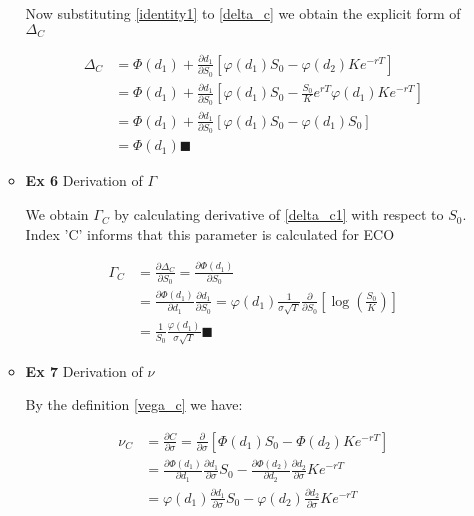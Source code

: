 \documentclass[12pt]{article}
\begin{document}
\begin{enumerate}[leftmargin=\labelsep]
\begin{itemize}
Now substituting \eqref{identity1} to \eqref{delta_c} we obtain the explicit form of $\Delta_C$

\begin{equation}
\begin{split}
 \label{delta_c1}
        \Delta_C &=  \Phi(d_1) + 
     \frac{\partial d_1}{\partial S_0} \left[ 
     \varphi(d_1)S_0
     -\varphi(d_2)Ke^{-rT}
     \right]\\   
     &=  \Phi(d_1) + 
     \frac{\partial d_1}{\partial S_0} \left[ 
     \varphi(d_1)S_0
     -\frac{S_0}{K} e^{rT} \varphi(d_1) Ke^{-rT}
     \right]\\  
     &=  \Phi(d_1) + 
     \frac{\partial d_1}{\partial S_0} \left[ 
     \varphi(d_1)S_0
     -\varphi(d_1) S_0
     \right]\\ 
     &=  \Phi(d_1) \blacksquare
\end{split}
\end{equation}

\item \textbf{Ex 6} Derivation of $\Gamma$

We obtain $\Gamma_C$ by calculating derivative of \eqref{delta_c1} with respect to $S_0$. Index 'C' informs that this parameter is calculated for ECO

\begin{equation}
\begin{split}\label{gamma}
        \Gamma_C &= \frac{\partial \Delta_C}{\partial S_0}
        = \frac{\partial \Phi(d_1)}{\partial S_0} \\
        &= \frac{\partial  \Phi(d_1)}{\partial d_1} 
        \frac{\partial  d_1}{\partial S_0} 
        = \varphi(d_1) \frac{1}{\sigma \sqrt{T}}\frac{\partial }{\partial S_0}  \left[ \log\left(\frac{S_0}{K}\right) \right] \\
        &= \frac{1}{S_0}\frac{\varphi(d_1)}{\sigma  \sqrt{T}} \blacksquare\end{split}
\end{equation}

\item \textbf{Ex 7} Derivation of $\nu$

By the definition \eqref{vega_c} we have:

\begin{equation}
\begin{split}\label{vega_c1}
        \nu_C &= \frac{\partial C}{\partial \sigma}
        = \frac{\partial }{\partial \sigma} 
        \left[ \Phi(d_1)S_0 - \Phi(d_2)Ke^{-rT} \right] \\
        &= \frac{\partial \Phi(d_1) }{\partial d_1} \frac{\partial d_1}{\partial \sigma} S_0
    - \frac{\partial \Phi(d_2) }{\partial d_2} \frac{\partial d_2}{\partial \sigma}
    Ke^{-rT}\\
        &= \varphi(d_1) \frac{\partial d_1}{\partial \sigma} S_0
    - \varphi(d_2) \frac{\partial d_2}{\partial \sigma}
    Ke^{-rT}\\
\end{split}
\end{equation}


\end{itemize}
\end{enumerate}
\end{document}

